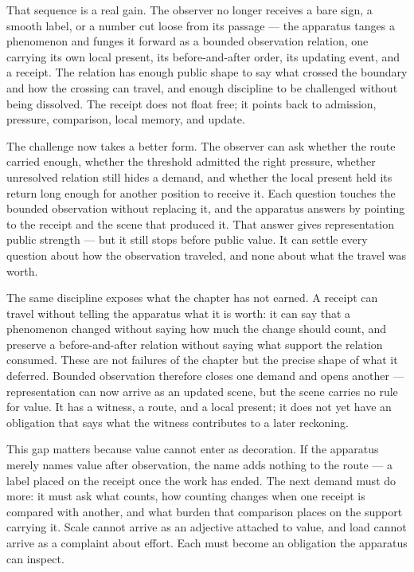 That sequence is a real gain. The observer no longer receives a bare sign, a smooth label, or a number cut loose from its passage --- the apparatus tanges a phenomenon and funges it forward as a bounded observation relation, one carrying its own local present, its before-and-after order, its updating event, and a receipt. The relation has enough public shape to say what crossed the boundary and how the crossing can travel, and enough discipline to be challenged without being dissolved. The receipt does not float free; it points back to admission, pressure, comparison, local memory, and update.

The challenge now takes a better form. The observer can ask whether the route carried enough, whether the threshold admitted the right pressure, whether unresolved relation still hides a demand, and whether the local present held its return long enough for another position to receive it. Each question touches the bounded observation without replacing it, and the apparatus answers by pointing to the receipt and the scene that produced it. That answer gives representation public strength --- but it still stops before public value. It can settle every question about how the observation traveled, and none about what the travel was worth.

The same discipline exposes what the chapter has not earned. A receipt can travel without telling the apparatus what it is worth: it can say that a phenomenon changed without saying how much the change should count, and preserve a before-and-after relation without saying what support the relation consumed. These are not failures of the chapter but the precise shape of what it deferred. Bounded observation therefore closes one demand and opens another --- representation can now arrive as an updated scene, but the scene carries no rule for value. It has a witness, a route, and a local present; it does not yet have an obligation that says what the witness contributes to a later reckoning.

This gap matters because value cannot enter as decoration. If the apparatus merely names value after observation, the name adds nothing to the route --- a label placed on the receipt once the work has ended. The next demand must do more: it must ask what counts, how counting changes when one receipt is compared with another, and what burden that comparison places on the support carrying it. Scale cannot arrive as an adjective attached to value, and load cannot arrive as a complaint about effort. Each must become an obligation the apparatus can inspect.

